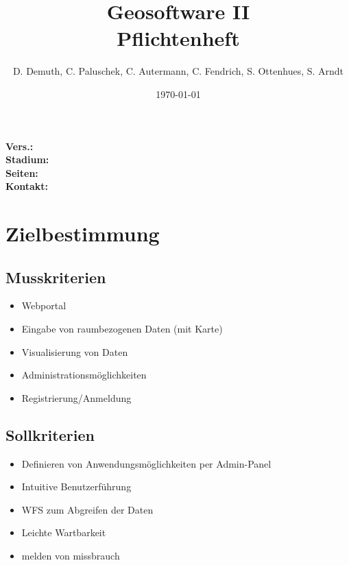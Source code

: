 \documentclass[a4paper,11pt]{article}             %
\begin{document}
\title{Geosoftware II \\ \small Pflichtenheft}
\author{D. Demuth, C. Paluschek, C. Autermann, C. Fendrich, S. Ottenhues, S. Arndt}
\date{\today}
\maketitle
\thispagestyle{empty}

\begin{center}
\bf Vers.: \MyVersion \\
\bf Stadium: \MyStatus\\
\bf Seiten: \thelastpage \\
\bf Kontakt: \email \\
\end{center}
\newpage

\tableofcontents

\newpage

\section{Zielbestimmung}
\subsection{Musskriterien}
\begin{itemize}
\item Webportal
\item Eingabe von raumbezogenen Daten (mit Karte)
\item Visualisierung von Daten
\item Administrationsmöglichkeiten
\item Registrierung/Anmeldung
\end{itemize}
\subsection{Sollkriterien}
\begin{itemize}
\item Definieren von Anwendungsmöglichkeiten per Admin-Panel
\item Intuitive Benutzerführung
\item WFS zum Abgreifen der Daten
\item Leichte Wartbarkeit
\item melden von missbrauch
\end{itemize}
\end{document}

